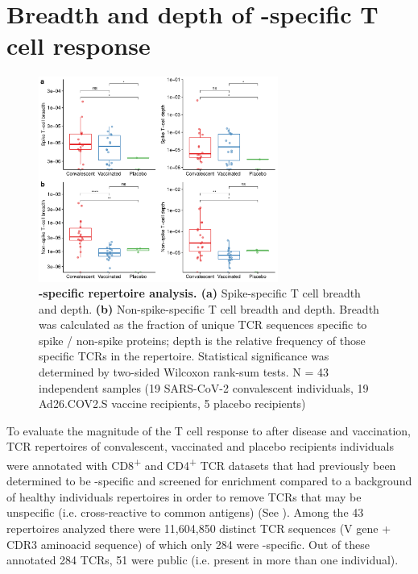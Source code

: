 




\section*{Breadth and depth of \covid-specific T cell response}


\begin{figure}[!t]
	\centering
	\includegraphics[width=0.7\textwidth,keepaspectratio]{figures/fig2.pdf}
	\caption{\textbf{\covid-specific \TCRB{} repertoire analysis. (a)} Spike-specific T cell breadth and depth. \textbf{(b)} Non-spike-specific T cell breadth and depth. Breadth was calculated as the fraction of unique TCR sequences specific to spike / non-spike proteins; depth is the relative frequency of those specific TCRs in the repertoire. Statistical significance was determined by two-sided Wilcoxon rank-sum tests. N = 43 independent samples (19 SARS-CoV-2 convalescent individuals, 19 Ad26.COV2.S vaccine recipients, 5 placebo recipients)}
	\label{fig:bd}
\end{figure}

To evaluate the magnitude of the T cell response to \covid{} after disease and vaccination, TCR repertoires of convalescent, vaccinated and placebo recipients individuals were annotated with CD8\textsuperscript{+} and CD4\textsuperscript{+} TCR datasets that had previously been determined to be \covid-specific and screened for enrichment compared to a background of healthy individuals repertoires in order to remove TCRs that may be unspecific (i.e. cross-reactive to common antigens) (See ). Among the 43 repertoires analyzed there were 11,604,850 distinct TCR sequences (V gene + CDR3 aminoacid sequence) of which only 284 were \covid-specific. Out of these annotated 284 TCRs, 51 were public (i.e. present in more than one individual).

